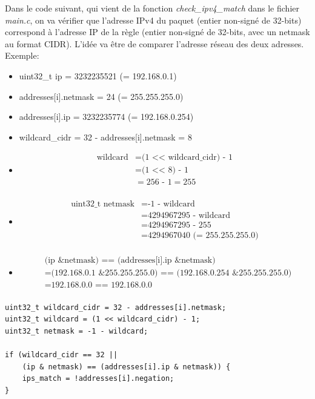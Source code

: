 \documentclass[a4paper]{article}
\begin{document}
Dans le code suivant, qui vient de la fonction \textit{check\_ipv4\_match} dans le fichier \textit{main.c}, on va vérifier que l'adresse IPv4 du paquet (entier non-signé de 32-bits) correspond à l'adresse IP de la règle (entier non-signé de 32-bits, avec un netmask au format CIDR). L'idée va être de comparer l'adresse réseau des deux adresses. Exemple:
\begin{itemize}
    \item uint32\_t ip = 3232235521 (= 192.168.0.1)
    \item addresses[i].netmask = 24 (= 255.255.255.0)
    \item addresses[i].ip = 3232235774 (= 192.168.0.254)
    \item wildcard\_cidr = 32 - addresses[i].netmask = 8
    \item \[\begin{aligned}
        \text{wildcard}
        &= \text{(1 <{}< wildcard\_cidr) - 1} \\
        &= \text{(1 <{}< 8) - 1} \\
        &= \text{256 - 1} = 255 \\
    \end{aligned}\]
    \item \[\begin{aligned}
        \text{uint32\_t netmask}
        &= \text{-1 - wildcard} \\
        &= \text{4294967295 - wildcard} \\
        &= \text{4294967295 - 255} \\
        &= \text{4294967040 (= 255.255.255.0)} \\
    \end{aligned}\]
    \item \[\begin{aligned}
        &\text{(ip \& netmask) == (addresses[i].ip \& netmask)} \\
        &= \text{(192.168.0.1 \& 255.255.255.0) == (192.168.0.254 \& 255.255.255.0)} \\
        &= \text{192.168.0.0 == 192.168.0.0} \\
    \end{aligned}\]
\end{itemize}

\begin{lstlisting}[style=CStyle]
uint32_t wildcard_cidr = 32 - addresses[i].netmask;
uint32_t wildcard = (1 << wildcard_cidr) - 1;
uint32_t netmask = -1 - wildcard;

if (wildcard_cidr == 32 ||
    (ip & netmask) == (addresses[i].ip & netmask)) {
    ips_match = !addresses[i].negation;
}
\end{lstlisting}
\end{document}
